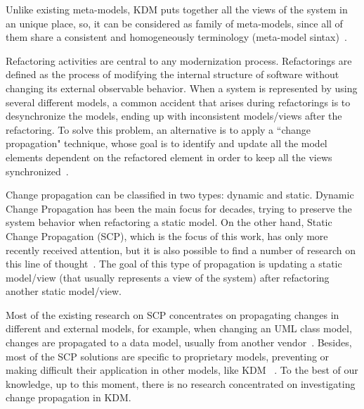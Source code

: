 Unlike existing meta-models, KDM puts together all the  views of the system in an unique place, so, it can be considered as family of meta-models, since all of them share a consistent and homogeneously terminology (meta-model sintax)~\cite{murduck}. %

Refactoring activities are central to any modernization process. Refactorings are defined as the process of modifying the internal structure of software without changing its external observable behavior\cite{refactImpro}. When a system is represented by using several different models, a common accident that arises during refactorings is  to desynchronize the models, ending up with inconsistent models/views after the refactoring. To solve this problem, an alternative is to apply a ``change propagation"  technique, whose goal is to identify and update all the model elements dependent on the refactored element in order to keep all the views synchronized~\cite{4440135, Mens:2006:TMT:1706639.1706924, Mens:2006_NEW, Mens:2007}.

Change propagation can be classified in two types: dynamic and static. Dynamic  Change Propagation has been the main focus for decades, trying to preserve the system behavior when refactoring a static model. On the other hand, Static Change Propagation (SCP), which is the focus of this work, has only more recently received attention, but it is also possible to find a number of research on this line of thought~\cite{4440135, Mens:2006:TMT:1706639.1706924, Mens:2006_NEW, Mens:2007}. The goal of this type of propagation is updating a static model/view (that usually represents a view of the system) after refactoring another static model/view.  

Most of the existing research on SCP concentrates on propagating changes in different and external models, for example, when changing an UML class model, changes are propagated to a data model, usually from another vendor~\cite{Supporting_change_propagation_in_UML_models}. Besides, most of the SCP solutions are specific to proprietary models, preventing or making difficult their application in other models, like KDM ~\cite{4440135, Mens:2007}. To the best of our knowledge, up to this moment, there is no research concentrated on investigating change propagation in KDM.

